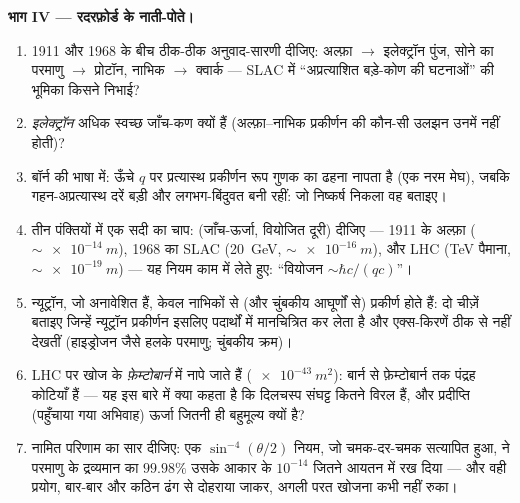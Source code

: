 \begin{problem}
\medskip\noindent\textbf{भाग IV --- रदरफ़ोर्ड के नाती-पोते।}
\begin{enumerate}[resume]
  \item 1911 और 1968 के बीच ठीक-ठीक अनुवाद-सारणी दीजिए:
        अल्फ़ा $\to$ इलेक्ट्रॉन पुंज, सोने का परमाणु $\to$ प्रोटॉन,
        नाभिक $\to$ क्वार्क --- SLAC में
        ``अप्रत्याशित बड़े-कोण की घटनाओं'' की भूमिका किसने निभाई?
  \item \emph{इलेक्ट्रॉन} अधिक स्वच्छ जाँच-कण क्यों हैं
        (अल्फ़ा--नाभिक प्रकीर्णन की कौन-सी उलझन उनमें नहीं होती)?
  \item बॉर्न की भाषा में: ऊँचे $q$ पर प्रत्यास्थ प्रकीर्णन रूप
        गुणक का ढहना नापता है (एक नरम मेघ), जबकि गहन-अप्रत्यास्थ
        दरें बड़ी और लगभग-बिंदुवत बनी रहीं: जो निष्कर्ष निकला वह
        बताइए।
  \item तीन पंक्तियों में एक सदी का चाप: (जाँच-ऊर्जा, वियोजित
        दूरी) दीजिए --- 1911 के अल्फ़ा ($\sim\qty{e-14}{m}$),
        1968 का SLAC (\qty{20}{GeV}, $\sim\qty{e-16}{m}$), और
        LHC (\unit{TeV} पैमाना, $\sim\qty{e-19}{m}$) --- यह
        नियम काम में लेते हुए: ``वियोजन $\sim \hbar c/(qc)$''।
  \item न्यूट्रॉन, जो अनावेशित हैं, केवल नाभिकों से (और चुंबकीय
        आघूर्णों से) प्रकीर्ण होते हैं: दो चीज़ें बताइए जिन्हें
        न्यूट्रॉन प्रकीर्णन इसलिए पदार्थों में मानचित्रित कर लेता है
        और एक्स-किरणें ठीक से नहीं देखतीं (हाइड्रोजन जैसे हलके
        परमाणु; चुंबकीय क्रम)।
  \item LHC पर खोज के  \emph{फ़ेम्टोबार्न} में नापे
        जाते हैं ($\qty{e-43}{m^2}$): बार्न से
        फ़ेम्टोबार्न तक पंद्रह कोटियाँ हैं --- यह इस बारे में क्या
        कहता है कि दिलचस्प संघट्ट कितने विरल हैं, और प्रदीप्ति
        (पहुँचाया गया अभिवाह) ऊर्जा जितनी ही बहुमूल्य क्यों है?
  \item नामित परिणाम का सार दीजिए: एक $\sin^{-4}(\theta/2)$ नियम,
        जो चमक-दर-चमक सत्यापित हुआ, ने परमाणु के द्रव्यमान का
        $99.98\%$ उसके आकार के $10^{-14}$ जितने आयतन में रख दिया ---
        और वही प्रयोग, बार-बार और कठिन ढंग से दोहराया जाकर, अगली
        परत खोजना कभी नहीं रुका।
\end{enumerate}
\end{problem}
